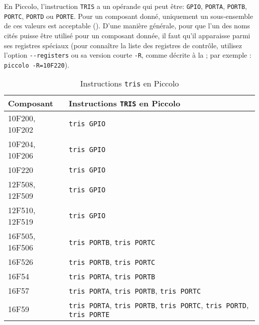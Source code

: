 
En Piccolo, l'instruction \texttt{TRIS} a un opérande qui peut être: \texttt{GPIO}, \texttt{PORTA}, \texttt{PORTB}, \texttt{PORTC}, \texttt{PORTD} ou \texttt{PORTE}. Pour un composant donné, uniquement un sous-ensemble de ces valeurs est acceptable (). D'une manière générale, pour que l'un des noms cités puisse être utilisé pour un composant donnée, il faut qu'il apparaisse parmi ses registres spéciaux (pour connaître la liste des registres de contrôle, utilisez l’option \texttt{-{}-registers} ou sa version courte \texttt{-R}, comme décrite à la  ; par exemple : \texttt{piccolo -R=10F220}).

\begin{table}[!ht]
  \centering
  \small
  \begin{tabular}{ll}
    \textbf{Composant} & \textbf{Instructions \texttt{TRIS} en Piccolo}\\
    \hline
    10F200, 10F202  & \texttt{tris GPIO}\\
    10F204, 10F206  & \texttt{tris GPIO}\\
    10F220  & \texttt{tris GPIO}\\
    12F508, 12F509  & \texttt{tris GPIO}\\
    12F510, 12F519  & \texttt{tris GPIO}\\
    16F505, 16F506  & \texttt{tris PORTB}, \texttt{tris PORTC}\\
    16F526  & \texttt{tris PORTB}, \texttt{tris PORTC}\\
    16F54  & \texttt{tris PORTA}, \texttt{tris PORTB}\\
    16F57  & \texttt{tris PORTA}, \texttt{tris PORTB}, \texttt{tris PORTC}\\
    16F59  & \texttt{tris PORTA}, \texttt{tris PORTB}, \texttt{tris PORTC}, \texttt{tris PORTD}, \texttt{tris PORTE}\\
    \hline
  \end{tabular}
  \caption{Instructions \texttt{tris} en Piccolo}
\end{table}













